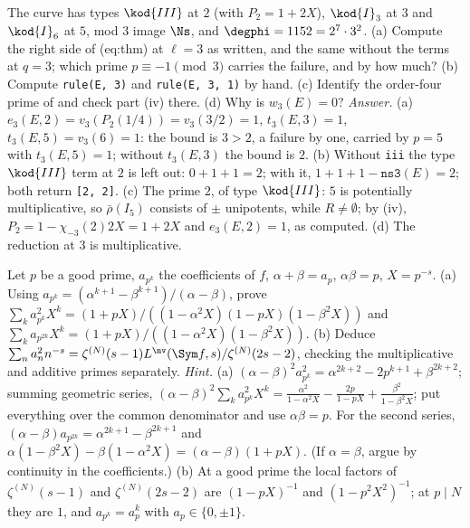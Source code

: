 \begin{sloppypar}
\begin{exercise}\label{ex:paper:726a1}
The curve  has types $\kod{III}$ at $2$ (with $P_2=1+2X$), $\kod{I}_3$ at $3$ and $\kod{I}_6$ at $5$, mod $3$ image $\Ns$, and $\degphi=1152=2^7\cdot3^2$. (a) Compute the right side of
(eq:thm) at $\ell=3$ as written, and the same without the terms at $q=3$; which prime $p\equiv-1\pmod3$ carries the failure, and by how much? (b) Compute \texttt{rule(E, 3)} and
\texttt{rule(E, 3, 1)} by hand. (c) Identify the order-four prime of  and check part (iv) there. (d) Why is $w_3(E)=0$?
\emph{Answer.} (a) $e_3(E,2)=v_3(P_2(1/4))=v_3(3/2)=1$, $t_3(E,3)=1$, $t_3(E,5)=v_3(6)=1$: the bound is $3>2$, a failure by one, carried by $p=5$ with $t_3(E,5)=1$; without $t_3(E,3)$ the
bound is $2$. (b) Without \texttt{iii} the type $\kod{III}$ term at $2$ is left out: $0+1+1=2$; with it, $1+1+1-\texttt{ns3}(E)=2$; both return \texttt{[2, 2]}. (c) The prime $2$, of type $\kod{III}$: $5$
is potentially multiplicative, so $\bar\rho(I_5)$ consists of $\pm$ unipotents, while $R\ne\emptyset$; by (iv), $P_2=1-\chi_{-3}(2)2X=1+2X$ and $e_3(E,2)=1$, as computed. (d) The reduction at $3$ is
multiplicative.
\end{exercise}

\begin{exercise}\label{ex:paper:rankin}
Let $p$ be a good prime, $a_{p^k}$ the coefficients of $f$, $\alpha+\beta=a_p$, $\alpha\beta=p$, $X=p^{-s}$. (a) Using $a_{p^k}=(\alpha^{k+1}-\beta^{k+1})/(\alpha-\beta)$, prove
$\sum_ka_{p^k}^2X^k=(1+pX)/((1-\alpha^2X)(1-pX)(1-\beta^2X))$ and $\sum_ka_{p^{2k}}X^k=(1+pX)/((1-\alpha^2X)(1-\beta^2X))$. (b) Deduce $\sum_na_n^2n^{-s}=\zeta^{(N)}(s-1)L^{\nv}(\Sym f,s)/\zeta^{(N)}(2s-2)$, checking the
multiplicative and additive primes separately.
\emph{Hint.} (a) $(\alpha-\beta)^2a_{p^k}^2=\alpha^{2k+2}-2p^{k+1}+\beta^{2k+2}$; summing geometric series,
$(\alpha-\beta)^2\sum_ka_{p^k}^2X^k=\frac{\alpha^2}{1-\alpha^2X}-\frac{2p}{1-pX}+\frac{\beta^2}{1-\beta^2X}$; put everything over the common denominator and use $\alpha\beta=p$. For the second series,
$(\alpha-\beta)a_{p^{2k}}=\alpha^{2k+1}-\beta^{2k+1}$ and $\alpha(1-\beta^2X)-\beta(1-\alpha^2X)=(\alpha-\beta)(1+pX)$. (If $\alpha=\beta$, argue by continuity in the coefficients.) (b) At a good prime the
local factors of $\zeta^{(N)}(s-1)$ and $\zeta^{(N)}(2s-2)$ are $(1-pX)^{-1}$ and $(1-p^2X^2)^{-1}$; at $p\mid N$ they are $1$, and $a_{p^k}=a_p^k$ with $a_p\in\{0,\pm1\}$.
\end{exercise}


\end{sloppypar}
